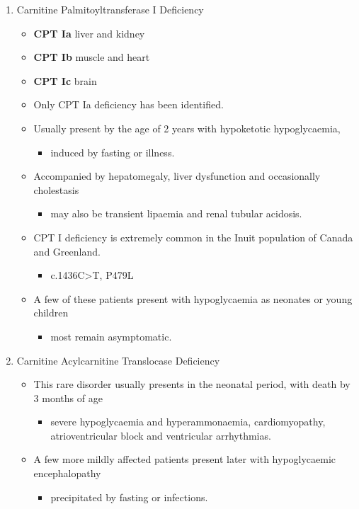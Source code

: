 \documentclass{scrartcl}
\begin{document}
\begin{enumerate}
\item Carnitine Palmitoyltransferase I Deficiency
\label{sec:orgfe6d5b0}
\begin{itemize}
\item \textbf{CPT Ia} liver and kidney
\item \textbf{CPT Ib}  muscle and heart
\item \textbf{CPT Ic}  brain

\item Only CPT Ia deficiency has been identified.
\item Usually present by the age of 2 years with hypoketotic hypoglycaemia,
\begin{itemize}
\item induced by fasting or illness.
\end{itemize}
\item Accompanied by hepatomegaly, liver dysfunction and occasionally cholestasis
\begin{itemize}
\item may also be transient lipaemia and renal tubular acidosis.
\end{itemize}
\item CPT I deficiency is extremely common in the Inuit population of Canada and Greenland.
\begin{itemize}
\item c.1436C>T, P479L
\end{itemize}
\item A few of these patients present with hypoglycaemia as neonates or young children
\begin{itemize}
\item most remain asymptomatic.
\end{itemize}
\end{itemize}

\item Carnitine Acylcarnitine Translocase Deficiency
\label{sec:org3de7463}

\begin{itemize}
\item This rare disorder usually presents in the neonatal period, with
death by 3 months of age
\begin{itemize}
\item severe hypoglycaemia and hyperammonaemia, cardiomyopathy,
atrioventricular block and ventricular arrhythmias.
\end{itemize}
\item A few more mildly affected patients present later with hypoglycaemic
encephalopathy
\begin{itemize}
\item precipitated by fasting or infections.
\end{itemize}
\end{itemize}


\end{enumerate}
\end{document}
